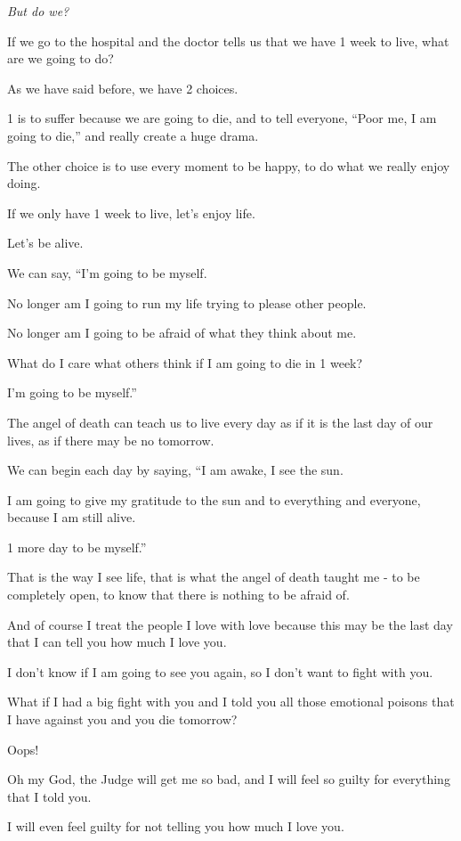 \documentclass{article}
\numberwithin{equation}{section}
\begin{document}
\textit{But do we?}

%
If we go to the hospital and the doctor tells us that we have 1 week to live, what are we going to do?

As we have said before, we have 2 choices.

1 is to suffer because we are going to die, and to tell everyone, ``Poor me, I am going to die,'' and really create a huge drama.

The other choice is to use every moment to be happy, to do what we really enjoy doing.

If we only have 1 week to live, let's enjoy life.

Let's be alive.

We can say, ``I'm going to be myself.

No longer am I going to run my life trying to please other people.

No longer am I going to be afraid of what they think about me.

What do I care what others think if I am going to die in 1 week?

I'm going to be myself.''

%
The angel of death can teach us to live every day as if it is the last day of our lives, as if there may be no tomorrow.

We can begin each day by saying, ``I am awake, I see the sun.

I am going to give my gratitude to the sun and to everything and everyone, because I am still alive.

1 more day to be myself.''

%
That is the way I see life, that is what the angel of death taught me - to be completely open, to know that there is nothing to be afraid of.

And of course I treat the people I love with love because this may be the last day that I can tell you how much I love you.

I don't know if I am going to see you again, so I don't want to fight with you.

%
What if I had a big fight with you and I told you all those emotional poisons that I have against you and you die tomorrow?

Oops!

Oh my God, the Judge will get me so bad, and I will feel so guilty for everything that I told you.

I will even feel guilty for not telling you how much I love you.
\end{document}
